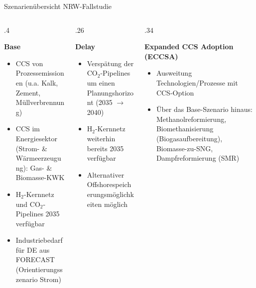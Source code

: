 \documentclass[10pt,aspectratio=169,dvipsnames]{beamer}
\begin{document}
\begin{frame}{Szenarienübersicht NRW-Fallstudie}
	\footnotesize

	\begin{columns}[T] %
		\begin{column}{.4\textwidth}
			\begin{minipage}[t][.45\textheight]{\linewidth}
				\begin{alertblock}{\textbf{Base}}
					\begin{itemize}
						\item CCS von Prozessemissionen (u.a. Kalk, Zement, Müllverbrennung)
						\item CCS im Energiesektor (Strom- \& Wärmeerzeugung): Gas- \& Biomasse-KWK
						\item H$_2$-Kernnetz und CO$_2$-Pipelines 2035 verfügbar
						\item Industriebedarf für DE aus FORECAST (Orientierungsszenario Strom)
					\end{itemize}
					\vspace{0.06cm}
				\end{alertblock}
			\end{minipage}
		\end{column}

		\begin{column}{.26\textwidth}
			\begin{minipage}[t][.45\textheight]{\linewidth}
				\begin{exampleblock}{\textbf{Delay}}
					\begin{itemize}
						\item Verspätung der CO$_2$-Pipelines um einen Planungshorizont (2035 $\rightarrow$ 2040)
						\item H$_2$-Kernnetz weiterhin bereits 2035 verfügbar
						\item Alternativer Offshorespeicherungsmöglichkeiten möglich
					\end{itemize}
				\end{exampleblock}
			\end{minipage}
		\end{column}

		\begin{column}{.34\textwidth}
			\begin{minipage}[t][.45\textheight]{\linewidth}
				\begin{exampleblock}{\textbf{Expanded CCS Adoption (ECCSA)}}
					\begin{itemize}
						\item Ausweitung Technologien/Prozesse mit CCS-Option
						\item Über das Base-Szenario hinaus: Methanolreformierung, Biomethanisierung (Biogasaufbereitung), Biomasse-zu-SNG, Dampfreformierung (SMR)
					\end{itemize}
				\end{exampleblock}
			\end{minipage}
		\end{column}
	\end{columns}


\end{frame}
\end{document}
